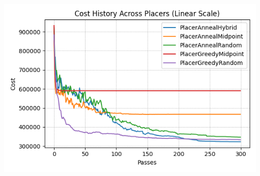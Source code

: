 {
    \centering
    \includegraphics[width=\columnwidth]{figures/results/combined_cost_history_linear.png}
    \label{fig:placers_overlay}
}


